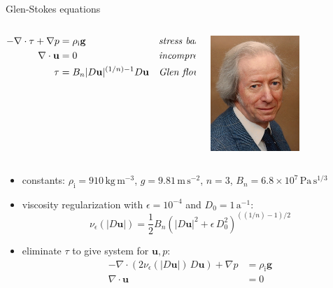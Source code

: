 \documentclass[10pt,hyperref,dvipsnames]{beamer}
\newcommand{\bg}{\mathbf{g}}
\newcommand{\bu}{\mathbf{u}}
\newcommand{\Div}{\nabla\cdot}
\newcommand{\eps}{\epsilon}
\begin{document}
\newcommand{\rhoi}{\rho_{\text{i}}}
\begin{frame}{Glen-Stokes equations}

\begin{columns}
\begin{column}{0.8\textwidth}
\begin{align*}
- \nabla \cdot \tau + \nabla p &= \rhoi \bg &&\text{\emph{stress balance}} \\
\nabla \cdot \bu &= 0 &&\text{\emph{incompressibility}} \\
\tau &= B_n |D\bu|^{(1/n) - 1} D\bu  &&\text{\emph{Glen flow law}}
\end{align*}
\end{column}

\begin{column}{0.2\textwidth}

\vspace{5mm}
\hfill \includegraphics[width=0.6\textwidth]{figs/people/jglen.png}
\end{column}
\end{columns}

\bigskip
\begin{itemize}
\item constants: {\small $\rhoi=910 \,\text{kg}\,\text{m}^{-3}$, $g=9.81\,\text{m}\,\text{s}^{-2}$, $n=3$, $B_n=6.8\times 10^7\,\text{Pa}\,\text{s}^{1/3}$}
\item viscosity regularization with $\eps = 10^{-4}$ and $D_0 = 1\,\text{a}^{-1}$:
\begin{equation*}
\nu_\eps(|D\bu|) = \frac{1}{2} B_n \left(|D\bu|^2 + \eps\, D_0^2\right)^{((1/n) - 1)/2}
\end{equation*}
\item eliminate $\tau$ to give system for $\bu,p$:
\begin{align*}
- \nabla \cdot \left(2 \nu_\eps(|D\bu|)\, D\bu\right) + \nabla p &= \rhoi \mathbf{g} \\
\Div \bu &= 0
\end{align*}
\end{itemize}
\end{frame}
\end{document}
